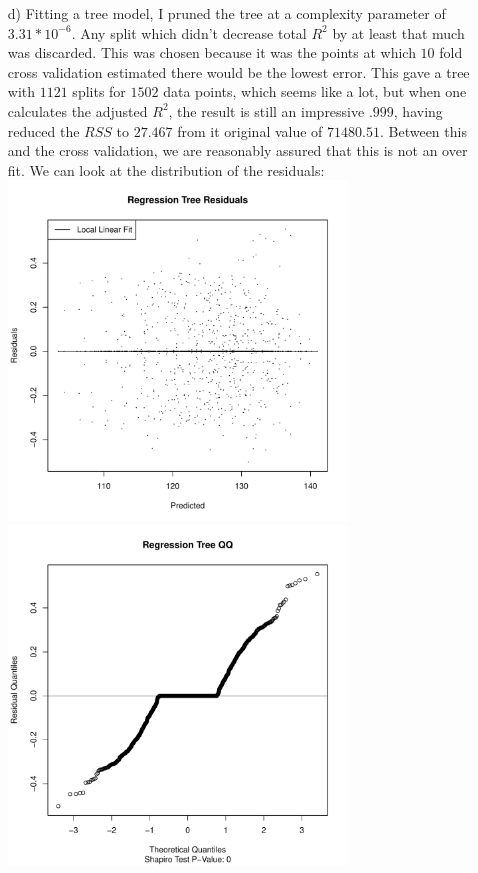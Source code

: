 \documentclass[11pt]{article}
\theoremstyle{definition}
\begin{document}
\begin{itemize}
\begin{itemize}
            \item[d)]
                Fitting a tree model, I pruned the tree at a complexity parameter of $3.31*10^{-6}$. Any split which didn't decrease total $R^2$ by at least that much was discarded. This was chosen because it was the points at which $10$ fold cross validation estimated there would be the lowest error. This gave a tree with $1121$ splits for $1502$ data points, which seems like a lot, but when one calculates the adjusted $R^2$, the result is still an impressive $.999$, having reduced the $RSS$ to $27.467$ from it original value of $71480.51$. Between this and the cross validation, we are reasonably assured that this is not an over fit. We can look at the distribution of the residuals:\\
                \includegraphics[width=9cm]{final/1d_res_plot_tree} 
                \includegraphics[width=9cm]{final/1d_qq_tree} \\

\end{itemize}
\end{itemize}
\end{document}
